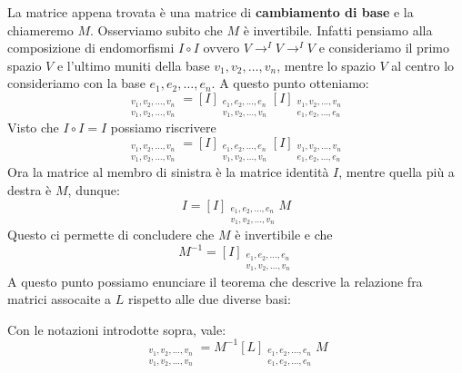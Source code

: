 La matrice appena trovata \`e una matrice di
\textbf{cambiamento di base} e la chiameremo $M$. Osserviamo subito che $M$ \`e
invertibile. Infatti pensiamo alla composizione di endomorfismi $I \circ I$
ovvero $V \to^{I} V \to^{I} V$ e consideriamo il primo spazio $V$ e l'ultimo muniti
della base $v_1, v_2, \dots, v_n$, mentre lo spazio $V$ al centro lo consideriamo
con la base $e_1, e_2, \dots, e_n$. A questo punto otteniamo:
\begin{equation*}
	[I \circ I]_{\substack{
		v_1, v_2, \dots, v_n \\
		v_1, v_2, \dots, v_n
	}} =
		[I]_{\substack{
				e_1, e_2, \dots, e_n\\
				v_1, v_2, \dots, v_n
			}}
		[I]_{\substack{
				v_1, v_2, \dots, v_n\\
				e_1, e_2, \dots, e_n
			}}
\end{equation*}
Visto che $I \circ I = I$ possiamo riscrivere
\begin{equation*}
	[I]_{\substack{
		v_1, v_2, \dots, v_n \\
		v_1, v_2, \dots, v_n
	}} =
		[I]_{\substack{
				e_1, e_2, \dots, e_n\\
				v_1, v_2, \dots, v_n
			}}
		[I]_{\substack{
				v_1, v_2, \dots, v_n\\
				e_1, e_2, \dots, e_n
			}}
\end{equation*}
Ora la matrice al membro di sinistra \`e la matrice identit\`a $I$, mentre quella
pi\`u a destra \`e $M$, dunque:
\begin{equation*}
	I = [I]_{\substack{
		e_1, e_2, \dots, e_n\\
		v_1, v_2, \dots, v_n
	}} M
\end{equation*}
Questo ci permette di concludere che $M$ \`e invertibile e che
\[
	M^{-1} = [I]_{\substack{
				e_1, e_2, \dots, e_n\\
				v_1, v_2, \dots, v_n
			}}
\]
A questo punto possiamo enunciare il teorema che descrive la relazione fra matrici
assocaite a $L$ rispetto alle due diverse basi:
\begin{theorem}
	Con le notazioni introdotte sopra, vale:
	\begin{equation*}
		[L]_{\substack{
				v_1, v_2, \dots, v_n \\
				v_1, v_2, \dots, v_n
			}} =
		M^{-1}[L]_{\substack{
					e_1, e_2, \dots, e_n\\
					e_1, e_2, \dots, e_n
				}}M
	\end{equation*}
\end{theorem}

